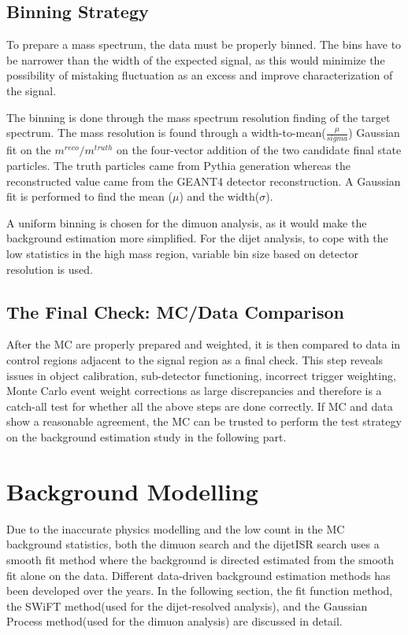 \subsection{Binning Strategy} 

To prepare a mass spectrum, the data must be properly binned. The bins have to be narrower than the width of the expected signal, as this would minimize the possibility of mistaking fluctuation as an excess and improve characterization of the signal.

The binning is done through the mass spectrum resolution finding of the target spectrum. The mass resolution is found through a width-to-mean($\frac{\mu}{sigma}$) Gaussian fit on the $m^{reco}/m^{truth}$ on the four-vector addition of the two candidate final state particles. The truth particles came from Pythia generation whereas the reconstructed value came from the GEANT4 detector reconstruction. A Gaussian fit is performed to find the mean ($\mu$) and the width($\sigma$).

A uniform binning is chosen for the dimuon analysis, as it would make the background estimation more simplified. For the dijet analysis, to cope with the low statistics in the high mass region, variable bin size based on detector resolution is used.

\subsection{The Final Check: MC/Data Comparison}
After the MC are properly prepared and weighted, it is then compared to data in control regions adjacent to the signal region as a final check. This step reveals issues in object calibration, sub-detector functioning, incorrect trigger weighting, Monte Carlo event weight corrections as large discrepancies and therefore is a catch-all test for whether all the above steps are done correctly. If MC and data show a reasonable agreement, the MC can be trusted to perform the test strategy on the
background estimation study in the following part. 

\section{Background Modelling}
\label{section:backgroundest}
    Due to the inaccurate physics modelling and the low count in the MC background statistics, both the dimuon search and the dijetISR search uses a smooth fit method where the background is directed estimated from the smooth fit alone on the data. 
    Different data-driven background estimation methods has been developed over the years.
    In the following section, the fit function method, the SWiFT method(used for the dijet-resolved analysis), and the Gaussian Process method(used for the dimuon analysis) are discussed in detail. 

